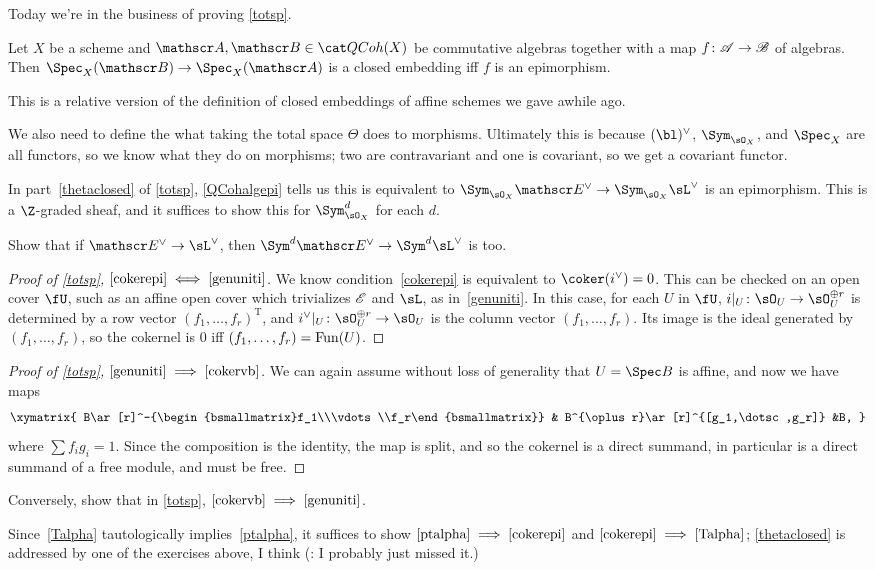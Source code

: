 Today we're in the business of proving \cref{totsp}.
\begin{lem}
\label{QCohalgepi}
Let $X$ be a scheme and $\sA,\sB\in\QCoh(X)$ be commutative algebras together with a map $f\colon\mathscr A\to\mathscr B$ of
algebras. Then $\Spec_X(\sB)\to\Spec_X(\sA)$ is a closed embedding iff $f$ is an epimorphism.
\end{lem}
This is a relative version of the definition of closed embeddings of affine schemes we gave awhile ago.

We also need to define the what taking the total space $\Theta$ does to morphisms. Ultimately this is because
$(\bl)^\vee$, $\Sym_{\sO_X}$, and $\Spec_X$ are all functors, so we know what they do on morphisms; two are
contravariant and one is covariant, so we get a covariant functor.

In part~\eqref{thetaclosed} of \cref{totsp}, \cref{QCohalgepi} tells us this is equivalent to
$\Sym_{\sO_X}\sE^\vee\to\Sym_{\sO_X}\sL^\vee$ is an epimorphism. This is a $\Z$-graded sheaf, and it suffices to
show this for $\Sym_{\sO_X}^d$ for each $d$.
\begin{ex}
Show that if $\sE^\vee\to\sL^\vee$, then $\Sym^d\sE^\vee\to\Sym^d\sL^\vee$ is too.
\end{ex}
\begin{proof}[Proof of \cref{totsp}, $\eqref{cokerepi} \iff \eqref{genuniti}$]
We know condition~\eqref{cokerepi} is equivalent to $\coker(i^\vee) = 0$. This can be checked on an open cover
$\fU$, such as an affine open cover which trivializes $\mathscr E$ and $\sL$, as in~\eqref{genuniti}. In this case, for
each $U$ in $\fU$, $i|_U\colon\sO_U\to\sO_U^{\oplus r}$ is determined by a row vector $(f_1,\dotsc,f_r)^{\mathrm
T}$, and $i^\vee|_U\colon\sO_U^{\oplus r}\to\sO_U$ is the column vector $(f_1,\dotsc,f_r)$. Its image is the ideal
generated by $(f_1,\dotsc,f_r)$, so the cokernel is $0$ iff $(f_1,\dotsc,f_r) = \mathrm{Fun}(U)$.
\end{proof}
\begin{proof}[Proof of \cref{totsp}, $\eqref{genuniti} \implies \eqref{cokervb}$]
We can again assume without loss of generality that $U = \Spec B$ is affine, and now we have maps
\begin{equation}
\xymatrix{
	B\ar[r]^-{\begin{bsmallmatrix}f_1\\\vdots\\f_r\end{bsmallmatrix}} & B^{\oplus r}\ar[r]^{[g_1,\dotsc,g_r]} &B,
}
\end{equation}
where $\sum f_ig_i = 1$. Since the composition is the identity, the map is split, and so the cokernel is a direct
summand, in particular is a direct summand of a free module, and must be free.
\end{proof}
\begin{ex}
Conversely, show that in \cref{totsp}, $\eqref{cokervb}\implies\eqref{genuniti}$.
\end{ex}
Since~\eqref{Talpha} tautologically implies~\eqref{ptalpha}, it suffices to show $\eqref{ptalpha}
\implies\eqref{cokerepi}$ and $\eqref{cokerepi}\implies\eqref{Talpha}$; \eqref{thetaclosed} is addressed by one of
the exercises above, I think (\TODO: I probably just missed it.)

